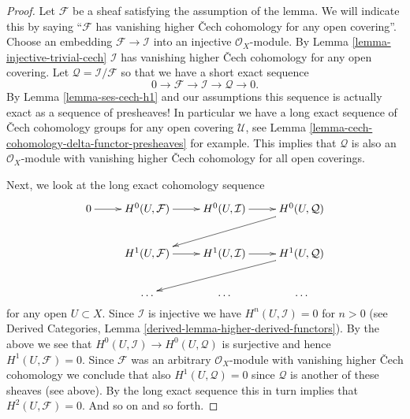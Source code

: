 \documentclass[10pt,a4paper]{amsart}
\theoremstyle{plain}
\theoremstyle{definition}
\theoremstyle{remark}
\numberwithin{equation}{subsection}
\begin{document}
\begin{proof}
Let $\mathcal{F}$ be a sheaf satisfying the assumption of the lemma.
We will indicate this by saying ``$\mathcal{F}$ has vanishing higher
{\v C}ech cohomology for any open covering''.
Choose an embedding $\mathcal{F} \to \mathcal{I}$ into an
injective $\mathcal{O}_X$-module.
By Lemma \ref{lemma-injective-trivial-cech} $\mathcal{I}$ has vanishing higher
{\v C}ech cohomology for any open covering.
Let $\mathcal{Q} = \mathcal{I}/\mathcal{F}$
so that we have a short exact sequence
$$
0 \to \mathcal{F} \to \mathcal{I} \to \mathcal{Q} \to 0.
$$
By Lemma \ref{lemma-ses-cech-h1} and our assumptions
this sequence is actually exact as a sequence of presheaves!
In particular we have a long exact sequence of {\v C}ech cohomology
groups for any open covering $\mathcal{U}$, see
Lemma \ref{lemma-cech-cohomology-delta-functor-presheaves}
for example. This implies that $\mathcal{Q}$ is also an $\mathcal{O}_X$-module
with vanishing higher {\v C}ech cohomology for all open coverings.

\medskip\noindent
Next, we look at the long exact cohomology sequence
$$
\xymatrix{
0 \ar[r] &
H^0(U, \mathcal{F}) \ar[r] &
H^0(U, \mathcal{I}) \ar[r] &
H^0(U, \mathcal{Q}) \ar[lld] \\
&
H^1(U, \mathcal{F}) \ar[r] &
H^1(U, \mathcal{I}) \ar[r] &
H^1(U, \mathcal{Q}) \ar[lld] \\
&
\ldots & \ldots & \ldots \\
}
$$
for any open $U \subset X$. Since $\mathcal{I}$ is injective we
have $H^n(U, \mathcal{I}) = 0$ for $n > 0$ (see
Derived Categories, Lemma \ref{derived-lemma-higher-derived-functors}).
By the above we see that $H^0(U, \mathcal{I}) \to H^0(U, \mathcal{Q})$
is surjective and hence $H^1(U, \mathcal{F}) = 0$.
Since $\mathcal{F}$ was an arbitrary $\mathcal{O}_X$-module with
vanishing higher {\v C}ech cohomology we conclude that also
$H^1(U, \mathcal{Q}) = 0$ since $\mathcal{Q}$ is another of these
sheaves (see above). By the long exact sequence this in turn implies
that $H^2(U, \mathcal{F}) = 0$. And so on and so forth.
\end{proof}
\end{document}
